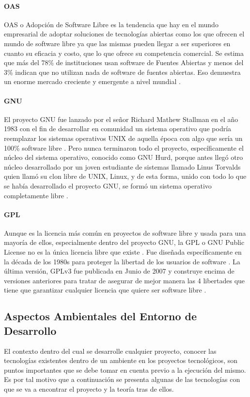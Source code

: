 \paragraph{OAS}
OAS o Adopción de Software Libre es la tendencia que hay en el mundo empresarial de adoptar soluciones de tecnologías abiertas como los que ofrecen el mundo de software libre ya que las mismas pueden llegar a ser superiores en cuanto su eficacia y costo, que lo que ofrece su competencia comercial. Se estima que más del 78\% de instituciones usan software  de Fuentes Abiertas y menos del 3\% indican que no utilizan nada de software de fuentes abiertas. Eso demuestra un enorme mercado creciente y emergente a nivel mundial \citep{ACCEL-OAS}.

\paragraph{GNU}
El proyecto GNU fue lanzado por el señor Richard Mathew Stallman en el año 1983 con el fin de desarrollar en comunidad un sistema operativo que podría reemplazar los sistemas operativos UNIX de aquella época con algo que sería un 100\% software libre \citep{GNU-GNU-OS}. Pero nunca terminaron todo el proyecto, específicamente el núcleo del sistema operativo, conocido como GNU Hurd, porque antes llegó otro núcleo desarrollado por un joven estudiante de sistemas llamado Linus Torvalds quien llamó su clon libre de UNIX, Linux, y de esta forma, unido con todo lo que se había desarrollado el proyecto GNU, se formó un sistema operativo completamente libre \citep{GNU-GNU-Linux}.

\paragraph{GPL}
Aunque es la licencia más común en proyectos de software libre y usada para una mayoría de ellos, especialmente dentro del proyecto GNU, la GPL o GNU Public License no es la única licencia libre que existe \citep{GNU-Licenses}. Fue diseñada específicamente en la década de los 1980s para proteger la libertad de los usuarios de software \citep{GNU-Open-vs-Free}. La última versión, GPLv3 fue publicada en Junio de 2007 y construye encima de versiones anteriores para tratar de asegurar de mejor manera las 4 libertades que tiene que garantizar cualquier licencia que quiere ser software libre \citep{GNU-GPL-Guide} \citep{GNU-GPL}.

\subsection{Aspectos Ambientales del Entorno de Desarrollo}
El contexto dentro del cual se desarrolle cualquier proyecto, conocer las tecnologías existentes dentro de un ambiente en los proyectos tecnológicos, son puntos importantes que se debe tomar en cuenta previo a la ejecución del mismo. Es por tal motivo que a continuación se presenta algunas de las tecnologías con que se va a encontrar el proyecto y la teoría tras de ellos.

